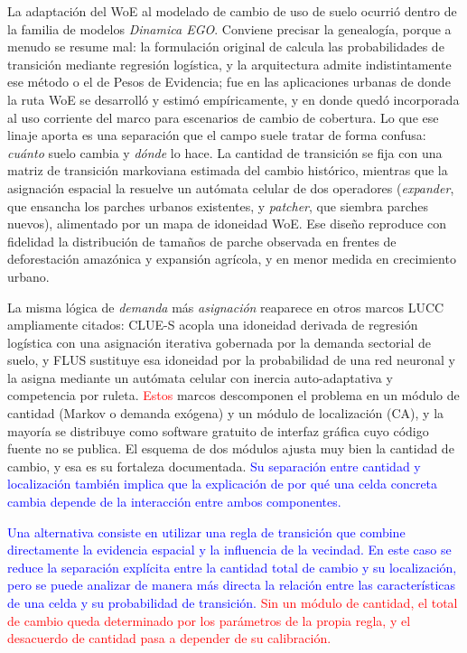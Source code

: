 La adaptación del WoE al modelado de cambio de uso de suelo ocurrió dentro de
la familia de modelos \textit{Dinamica EGO}. Conviene precisar la genealogía,
porque a menudo se resume mal: la formulación original de
\textcite{SoaresFilho2002} calcula las probabilidades de transición mediante
regresión logística, y la arquitectura admite indistintamente ese método o el
de Pesos de Evidencia; fue en las aplicaciones urbanas de
\textcite{Almeida2003} donde la ruta WoE se desarrolló y estimó empíricamente,
y en \textcite{SoaresFilho2004} donde quedó incorporada al uso corriente del
marco para escenarios de cambio de cobertura. Lo que ese linaje aporta es una
separación que el campo suele tratar de forma confusa: \emph{cuánto} suelo
cambia y \emph{dónde} lo hace. La cantidad de transición se fija con una
matriz de transición markoviana estimada del cambio histórico, mientras que la
asignación espacial la resuelve un autómata celular de dos operadores
(\textit{expander}, que ensancha los parches urbanos existentes, y
\textit{patcher}, que siembra parches nuevos), alimentado por un mapa de
idoneidad WoE. Ese diseño reproduce con fidelidad la distribución de tamaños
de parche observada en frentes de deforestación amazónica y expansión agrícola,
y en menor medida en crecimiento urbano.

La misma lógica de \emph{demanda} más \emph{asignación} reaparece en otros
marcos LUCC ampliamente citados: CLUE-S \parencite{Verburg2002} acopla una
idoneidad derivada de regresión logística con una asignación iterativa
gobernada por la demanda sectorial de suelo, y FLUS \parencite{Liu2017}
sustituye esa idoneidad por la probabilidad de una red neuronal y la asigna
mediante un autómata celular con inercia auto-adaptativa y competencia por
ruleta. \textcolor{red}{Estos} marcos descomponen el problema en un módulo de
cantidad (Markov o demanda exógena) y un módulo de localización (CA), y la
mayoría se distribuye como software gratuito de interfaz gráfica cuyo código
fuente no se publica. El esquema de dos módulos ajusta muy bien la cantidad de
cambio, y esa es su fortaleza documentada. \textcolor{blue}{Su separación entre
cantidad y localización también implica que la explicación de por qué una
celda concreta cambia depende de la interacción entre ambos componentes.}

\textcolor{blue}{Una alternativa consiste en utilizar una regla de transición
que combine directamente la evidencia espacial y la influencia de la
vecindad. En este caso se reduce la separación explícita entre la cantidad
total de cambio y su localización, pero se puede analizar de manera más directa
la relación entre las características de una celda y su probabilidad de
transición.} \textcolor{red}{Sin un módulo de cantidad, el total de cambio
queda determinado por los parámetros de la propia regla, y el desacuerdo de
cantidad pasa a depender de su calibración.}

